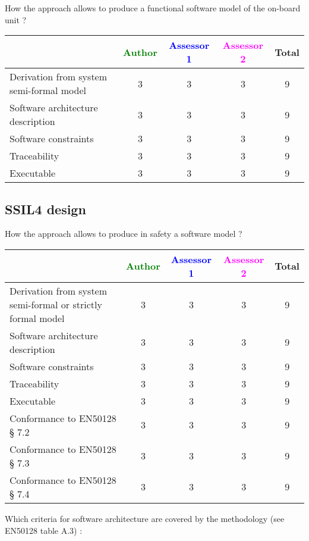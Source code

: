 How the approach allows to  produce a functional software model of the on-board unit ?

\begin{tabular}{|l | c | c | c | c|}
\hline
& \textcolor{green}{Author} & \textcolor{blue}{Assessor 1} & \textcolor{magenta}{Assessor 2} & Total \\
\hline
Derivation from system semi-formal model  & 3 & 3 & 3 & 9 \\
\hline 
Software architecture description  & 3 & 3 & 3 & 9 \\
\hline
Software constraints  & 3 & 3 & 3 & 9 \\
\hline
Traceability  & 3 & 3 & 3 & 9 \\
\hline
Executable  & 3  & 3 & 3 & 9 \\
\hline
\end{tabular}

\subsection{SSIL4 design}

How the approach allows to  produce in safety a software model ?

\begin{tabular}{|l | c | c | c | c|}
\hline
& \textcolor{green}{Author} & \textcolor{blue}{Assessor 1} & \textcolor{magenta}{Assessor 2} & Total \\
\hline
Derivation from system semi-formal or strictly formal model  & 3 & 3 & 3 & 9 \\
\hline 
Software architecture description  & 3 & 3 & 3 & 9 \\
\hline
Software constraints  & 3 & 3 & 3 & 9 \\
\hline
Traceability  & 3 & 3 & 3 & 9  \\
\hline
Executable  & 3 & 3 & 3 & 9 \\
\hline
Conformance to EN50128 § 7.2  & 3 & 3 & 3 & 9 \\
\hline
Conformance to EN50128 § 7.3  & 3 & 3 & 3 & 9 \\
\hline
Conformance to EN50128 § 7.4  & 3 & 3 & 3 & 9 \\
\hline
\end{tabular}

Which criteria for software architecture are covered by the methodology
(see EN50128 table A.3) :

